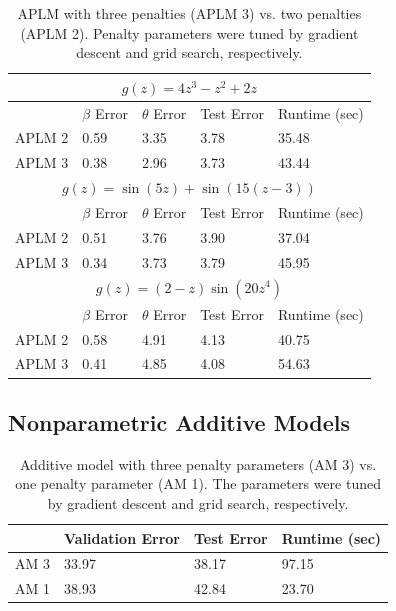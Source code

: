 \documentclass{statsoc}
\begin{document}
\begin{table}
\caption{\label{ref:aplm} APLM with three penalties (APLM 3) vs. two penalties (APLM 2). Penalty parameters were tuned by gradient descent and grid search, respectively.}
\centering
\begin{tabular}{| l | l | l | l | l | }
\hline
\multicolumn{5}{|c|}{$g(z) = 4z^3 - z^2 + 2z$}\\
\hline
 & $\beta$ Error & $\theta$ Error & Test Error & Runtime (sec) \\
\hline
APLM 2 & 0.59 & 3.35 & 3.78 & 35.48 \\
\hline
APLM 3 & 0.38 & 2.96 & 3.73 & 43.44 \\
\hline
\multicolumn{5}{|c|}{$g(z) = \sin(5z) + \sin(15(z - 3))$}\\
\hline
 & $\beta$ Error & $\theta$ Error & Test Error & Runtime (sec) \\
\hline
APLM 2 & 0.51 & 3.76 & 3.90 & 37.04 \\
\hline
APLM 3 & 0.34 & 3.73 & 3.79 & 45.95 \\
\hline
\multicolumn{5}{|c|}{$g(z) = (2-z)\sin(20z^4)$}\\
\hline
 & $\beta$ Error & $\theta$ Error & Test Error & Runtime (sec) \\
\hline
APLM 2 & 0.58 & 4.91 & 4.13 & 40.75 \\
\hline
APLM 3 & 0.41 & 4.85 & 4.08 & 54.63 \\
\hline
\end{tabular}
\end{table}

\subsection{Nonparametric Additive Models}

\begin{table}
\caption {\label{tab:additive} Additive model with three penalty parameters (AM 3) vs. one penalty parameter (AM 1). The parameters were tuned by gradient descent and grid search, respectively.}
\centering
\begin{tabular}{| l | l | l | l | }
\hline
& Validation Error & Test Error & Runtime (sec) \\
\hline
AM 3 & 33.97 & 38.17 & 97.15 \\
\hline
AM 1 & 38.93 & 42.84 & 23.70 \\
\hline
\end{tabular}
\end{table}
\end{document}
